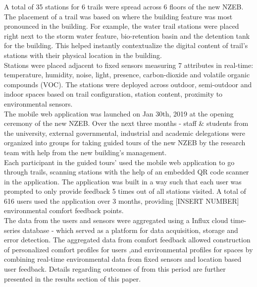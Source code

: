 
A total of 35 stations for 6 trails were spread across 6 floors of the new NZEB. The placement of a trail was based on where the building feature was most pronounced in the building. For example, the water trail stations were placed right next to the storm water feature, bio-retention basin and the detention tank for the building. This helped instantly contextualize the digital content of trail's stations with their physical location in the building.\\

Stations were placed adjacent to fixed sensors measuring 7 attributes in real-time: temperature, humidity, noise, light, presence, carbon-dioxide and volatile organic compounds (VOC). The stations were deployed across outdoor, semi-outdoor and indoor spaces based on trail configuration, station content, proximity to environmental sensors.\\

The mobile web application was launched on Jan 30th, 2019 at the opening ceremony of the new NZEB. Over the next three months - staff \& students from the university, external governmental, industrial and academic delegations were organized into groups for taking guided tours of the new NZEB by the research team with help from the new building's management.\\

Each participant in the guided tours' used the mobile web application to go through trails, scanning stations with the help of an embedded QR code scanner in the application. The application was built in a way such that each user was prompted to only provide feedback 5 times out of all stations visited. A total of 616 users used the application over 3 months, providing [INSERT NUMBER] environmental comfort feedback points.\\

The data from the users and sensors were aggregated using a Influx cloud time-series database - which served as a platform for data acquisition, storage and error detection. The aggregated data from comfort feedback allowed construction of personalized comfort profiles for users ,and environmental profiles for spaces by combining real-time environmental data from fixed sensors and location based user feedback. Details regarding outcomes of from this period are further presented in the results section of this paper.\\



